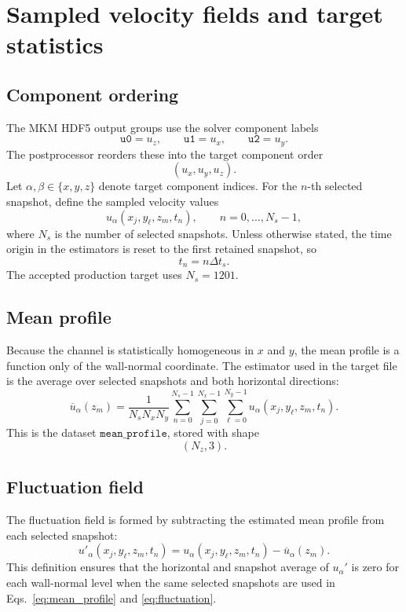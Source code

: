 \documentclass[11pt]{article}
\begin{document}
\section{Sampled velocity fields and target statistics}
\label{sec:sampled_outputs}

\subsection{Component ordering}

The MKM HDF5 output groups use the solver component labels
\[
  \texttt{u0}=u_z,\qquad
  \texttt{u1}=u_x,\qquad
  \texttt{u2}=u_y.
\]
The postprocessor reorders these into the target component order
\[
  (u_x,u_y,u_z).
\]
Let \(\alpha,\beta\in\{x,y,z\}\) denote target component indices. For the
\(n\)-th selected snapshot, define the sampled velocity values
\[
  u_\alpha(x_j,y_\ell,z_m,t_n),
  \qquad n=0,\ldots,N_s-1,
\]
where \(N_s\) is the number of selected snapshots. Unless otherwise stated,
the time origin in the estimators is reset to the first retained snapshot, so
\[
  t_n=n\Delta t_s .
\]
The accepted production target uses \(N_s=1201\).

\subsection{Mean profile}

Because the channel is statistically homogeneous in \(x\) and \(y\), the mean
profile is a function only of the wall-normal coordinate. The estimator used in
the target file is the average over selected snapshots and both horizontal
directions:
\begin{equation}
  \overline{u}_{\alpha}(z_m)
  =
  \frac{1}{N_sN_xN_y}
  \sum_{n=0}^{N_s-1}
  \sum_{j=0}^{N_x-1}
  \sum_{\ell=0}^{N_y-1}
  u_\alpha(x_j,y_\ell,z_m,t_n).
  \label{eq:mean_profile}
\end{equation}
This is the dataset \(\texttt{mean\_profile}\), stored with shape
\[
  (N_z,3).
\]

\subsection{Fluctuation field}

The fluctuation field is formed by subtracting the estimated mean profile from
each selected snapshot:
\begin{equation}
  u'_\alpha(x_j,y_\ell,z_m,t_n)
  =
  u_\alpha(x_j,y_\ell,z_m,t_n)
  -
  \overline{u}_{\alpha}(z_m).
  \label{eq:fluctuation}
\end{equation}
This definition ensures that the horizontal and snapshot average of
\(u_\alpha'\) is zero for each wall-normal level when the same selected
snapshots are used in Eqs.~\eqref{eq:mean_profile} and
\eqref{eq:fluctuation}.
\end{document}

